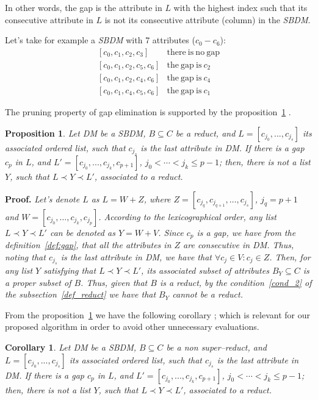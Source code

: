 \documentclass[number,preprint,review,12pt]{elsarticle}
\newtheorem{proposition}{Proposition}
\newtheorem{corollary}{Corollary}
\begin{document}
	In other words, the gap is the attribute in $L$ with the highest index such that its consecutive attribute in $L$ is not its consecutive attribute (column) in the \textit{SBDM}.
	
	Let's take for example a \textit{SBDM} with 7 attributes ($c_0 - c_6$):
	$$\begin{array}{ll}
	{[c_0,c_1,c_2,c_3]} 		& \mathrm{there~is~no~gap}\\
	{[c_0,c_1,c_2,c_5,c_6]} 	& \mathrm{the~gap~is~} c_2\\
	{[c_0,c_1,c_2,c_4,c_6]} 	& \mathrm{the~gap~is~} c_4\\
	{[c_0,c_1,c_4,c_5,c_6]} 	& \mathrm{the~gap~is~} c_1
	\end{array}$$


	The pruning property of gap elimination is supported by the proposition~\ref{prop:gap} \citep{Santiesteban03}. 
		
	\begin{proposition}\label{prop:gap} 
		Let DM be a SBDM, $B \subseteq C$ be a reduct, and $L = [c_{j_0},...,c_{j_s}]$ its associated ordered list, such that $c_{j_s}$ is the last attribute in DM. If there is a gap $c_p$ in $L$, and $L' = [c_{j_0},...,c_{j_k},c_{p+1}]$, $j_0<\cdots <j_k\leq p-1$; then, there is not a list $Y$, such that $L \prec Y \prec L'$, associated to a reduct.
	\end{proposition}	
	
	\noindent
	\textbf{Proof.} \textit{\label{proof:gap} 
	Let's denote $L$ as $L=W+Z$, where $Z=[c_{j_q},c_{j_{q+1}}, \dots, c_{j_s}]$, $j_q=p+1$ and $W=[c_{j_0}, \dots,c_{j_k}, c_{j_p}]$. According to the lexicographical order, any list $L \prec Y \prec L'$ can be denoted as $Y=W+V$. Since $c_p$ is a gap, we have from the definition~\ref{def:gap}, that all the attributes in $Z$ are consecutive in DM. Thus, noting that $c_{j_s}$ is the last attribute in DM, we have that $\forall c_j \in V: c_j \in Z$. Then, for any list $Y$ satisfying that $L \prec Y \prec L'$, its associated subset of attributes $B_Y \subseteq C$ is a proper subset of $B$. Thus, given that $B$ is a reduct, by the condition~\ref{cond_2} of the subsection~\ref{def_reduct} we have that $B_Y$ cannot be a reduct.}
	
	From the proposition~\ref{prop:gap} we have the following corollary \citep{Santiesteban03}; which is relevant for our proposed algorithm in order to avoid other unnecessary evaluations.
	
	\begin{corollary}\label{coro:gap} 
		Let DM be a SBDM, $B \subseteq C$ be a non super--reduct, and $L = [c_{j_0},...,c_{j_s}]$ its associated ordered list, such that $c_{j_s}$ is the last attribute in DM. If there is a gap $c_p$ in $L$, and $L' = [c_{j_0},...,c_{j_k},c_{p+1}]$, $j_0<\cdots <j_k\leq p-1$; then, there is not a list $Y$, such that $L \prec Y \prec L'$, associated to a reduct.
	\end{corollary}
		
\end{document}
